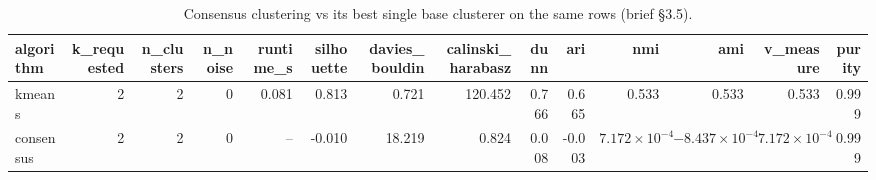 \begin{table}[htbp]
\centering
\begin{tabular}{lrrrrrrrrrrrrr}
\toprule
algorithm & k\_requested & n\_clusters & n\_noise & runtime\_s & silhouette & davies\_bouldin & calinski\_harabasz & dunn & ari & nmi & ami & v\_measure & purity \\
\midrule
kmeans & 2 & 2 & 0 & 0.081 & 0.813 & 0.721 & 120.452 & 0.766 & 0.665 & 0.533 & 0.533 & 0.533 & 0.999 \\
consensus & 2 & 2 & 0 & -- & -0.010 & 18.219 & 0.824 & 0.008 & -0.003 & $7.172\times 10^{-4}$ & $-8.437\times 10^{-4}$ & $7.172\times 10^{-4}$ & 0.999 \\
\bottomrule
\end{tabular}
\caption{Consensus clustering vs its best single base clusterer on the same rows (brief §3.5).}
\label{tab:consensus}
\end{table}
